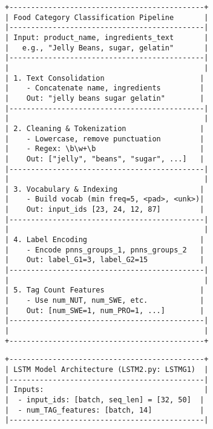 \documentclass[11pt]{article}
\begin{document}
\begin{figure}[H]
\centering
\begin{minipage}{0.48\textwidth}
\centering
\begin{lstlisting}[basicstyle=\ttfamily\scriptsize,breaklines=true,columns=flexible,frame=single,xleftmargin=0pt]
+---------------------------------------------+
| Food Category Classification Pipeline       |
|---------------------------------------------|
| Input: product_name, ingredients_text       |
|   e.g., "Jelly Beans, sugar, gelatin"       |
|---------------------------------------------|
|                                             |
| 1. Text Consolidation                      |
|    - Concatenate name, ingredients         |
|    Out: "jelly beans sugar gelatin"        |
|---------------------------------------------|
|                                             |
| 2. Cleaning & Tokenization                 |
|    - Lowercase, remove punctuation         |
|    - Regex: \b\w+\b                        |
|    Out: ["jelly", "beans", "sugar", ...]   |
|---------------------------------------------|
|                                             |
| 3. Vocabulary & Indexing                   |
|    - Build vocab (min freq=5, <pad>, <unk>)|
|    Out: input_ids [23, 24, 12, 87]         |
|---------------------------------------------|
|                                             |
| 4. Label Encoding                          |
|    - Encode pnns_groups_1, pnns_groups_2   |
|    Out: label_G1=3, label_G2=15            |
|---------------------------------------------|
|                                             |
| 5. Tag Count Features                      |
|    - Use num_NUT, num_SWE, etc.            |
|    Out: [num_SWE=1, num_PRO=1, ...]        |
|---------------------------------------------|
|                                             |
+---------------------------------------------+
\end{lstlisting}
\end{minipage}
\hfill
\begin{minipage}{0.48\textwidth}
\centering
\begin{lstlisting}[basicstyle=\ttfamily\scriptsize,breaklines=true,columns=flexible,frame=single,xleftmargin=0pt]
+---------------------------------------------+
| LSTM Model Architecture (LSTM2.py: LSTMG1)  |
|---------------------------------------------|
| Inputs:                                     |
|  - input_ids: [batch, seq_len] = [32, 50]  |
|  - num_TAG_features: [batch, 14]           |
|---------------------------------------------|

\end{lstlisting}
\end{minipage}
\end{figure}
\end{document}
